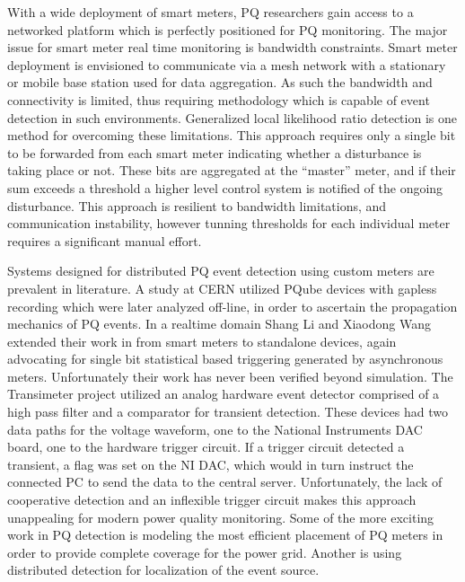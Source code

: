 With a wide deployment of smart meters, PQ researchers gain access to a networked platform which is perfectly positioned for PQ monitoring.\cite{hoglund2012using}
The major issue for smart meter real time monitoring is bandwidth constraints.
Smart meter deployment is envisioned to communicate via a mesh network with a stationary or mobile base station used for data aggregation.
As such the bandwidth and connectivity is limited, thus requiring methodology which is capable of event detection in such environments.
Generalized local likelihood ratio detection is one method for overcoming these limitations.
This approach requires only a single bit to be forwarded from each smart meter indicating whether a disturbance is taking place or not.
These bits are aggregated at the ``master'' meter, and if their sum exceeds a threshold a higher level control system is notified of the ongoing disturbance.\cite{li2016cooperative} This approach is resilient to bandwidth limitations, and communication instability, however tunning thresholds for each individual meter requires a significant manual effort.

Systems designed for distributed PQ event detection using custom meters are prevalent in literature.
A study at CERN utilized PQube devices with gapless recording which were later analyzed off-line, in order to ascertain the propagation mechanics of PQ events.\cite{kahle2016power} In a realtime domain Shang Li and Xiaodong Wang extended their work in \cite{li2016cooperative} from smart meters to standalone devices, again advocating for single bit statistical based triggering generated by asynchronous meters.\cite{li2013monitoring} Unfortunately their work has never been verified beyond simulation.
The Transimeter project utilized an analog hardware event detector comprised of a high pass filter and a comparator for transient detection.
These devices had two data paths for the voltage waveform, one to the National Instruments DAC board, one to the hardware trigger circuit.
If a trigger circuit detected a transient, a flag was set on the NI DAC, which would in turn instruct the connected PC to send the data to the central server.\cite{daponte2004transientmeter} Unfortunately, the lack of cooperative detection and an inflexible trigger circuit makes this approach unappealing for modern power quality monitoring.
Some of the more exciting work in PQ detection is modeling the most efficient placement of PQ meters in order to provide complete coverage for the power grid. \cite{won2006new} Another is using distributed detection for localization of the event source.\cite{parsons1998direction} \cite{polajvzer2017evaluation}

